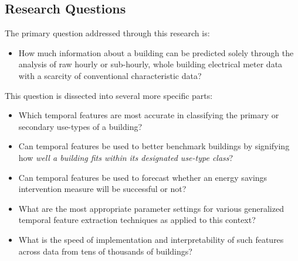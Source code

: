 \subsection{Research Questions}
The primary question addressed through this research is:
\begin{itemize}
\item How much information about a building can be predicted solely through the analysis of raw hourly or sub-hourly, whole building electrical meter data with a scarcity of conventional characteristic data? 
\end{itemize}
This question is dissected into several more specific parts:
\begin{itemize}
\item Which temporal features are most accurate in classifying the primary or secondary use-types of a building?
\item Can temporal features be used to better benchmark buildings by signifying how \emph{well a building fits within its designated use-type class}?
\item Can temporal features be used to forecast whether an energy savings intervention measure will be successful or not?
\item What are the most appropriate parameter settings for various generalized temporal feature extraction techniques as applied to this context?
\item What is the speed of implementation and interpretability of such features across data from tens of thousands of buildings?
\end{itemize}






